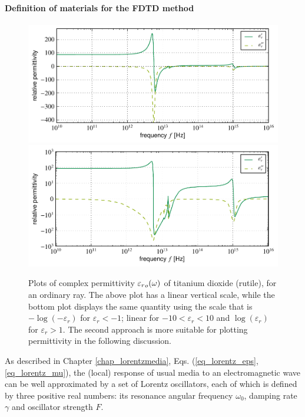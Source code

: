 \paragraph{Definition of materials for the FDTD method} %
\label{def_of_mat}

\begin{figure}[t] \caption{Plots of complex permittivity ${\varepsilon_r}_o(\omega)$ of titanium dioxide (rutile), for an ordinary ray. The above plot has a linear vertical scale, while the bottom plot displays the same quantity using the scale that is $-\log(-\varepsilon_r)$ for $\varepsilon_r<-1$; linear for $-10<\varepsilon_r<10$ and $\log(\varepsilon_r)$ for $\varepsilon_r > 1$. The second approach is more suitable for plotting permittivity in the following discussion.} \label{fg_tio2eps} \centering 
	\includegraphics[width=14cm]{img/epsilon_TiO2_linear.pdf}
	\includegraphics[width=14cm]{img/epsilon_TiO2_symlog.pdf}
\end{figure}


As described in Chapter \ref{chap_lorentzmedia}, Eqs. (\ref{eq_lorentz_eps}, \ref{eq_lorentz_mu}), the (local) response of usual media to an electromagnetic wave can be well approximated by a set of Lorentz oscillators, each of which is defined by three positive real numbers: its resonance angular frequency $\omega_{0}$, damping rate $\gamma$ and oscillator strength $F$. %

